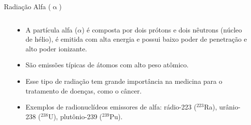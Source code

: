 \documentclass[presentation,professionalfonts,aspectratio=169]{beamer}
\begin{document}
\begin{frame}[label={sec:orgd2054cb}]{Radiação Alfa (\(\upalpha\))}
\begin{columns}
\begin{column}{0.45\columnwidth}
\end{column}


\begin{column}{0.45\columnwidth}
\begin{itemize}
\item A partícula alfa (\(\alpha\)) é composta por dois prótons e dois nêutrons (núcleo de hélio), é emitida com alta energia e possui baixo poder de penetração e alto poder ionizante.
\item São emissões típicas de átomos com alto peso atômico.
\item Esse tipo de radiação tem grande importância na medicina para o tratamento de doenças, como o câncer.
\item Exemplos de radionuclídeos emissores de alfa: rádio-223 (\(^{223}\)Ra), urânio-238 (\(^{238}\)U), plutônio-239 (\(^{239}\)Pu).
\end{itemize}
\end{column}
\end{columns}
\end{frame}
\end{document}
